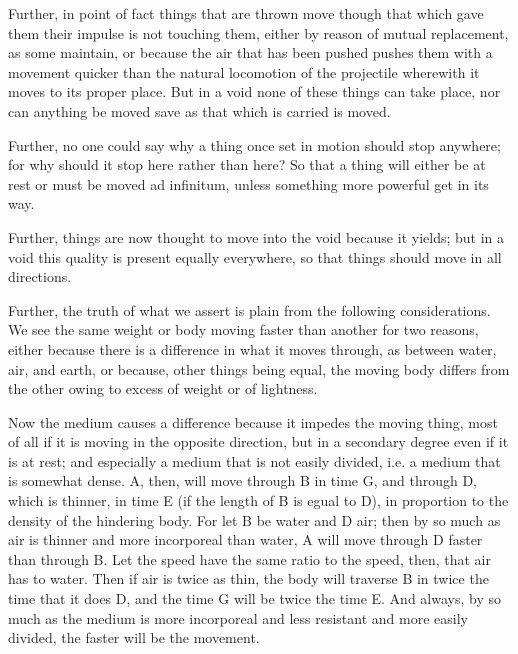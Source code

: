Further, in point of fact things that are thrown move though that
which gave them their impulse is not touching them, either by reason
of mutual replacement, as some maintain, or because the air that has
been pushed pushes them with a movement quicker than the natural locomotion
of the projectile wherewith it moves to its proper place. But in a
void none of these things can take place, nor can anything be moved
save as that which is carried is moved. 

Further, no one could say why a thing once set in motion should stop
anywhere; for why should it stop here rather than here? So that a
thing will either be at rest or must be moved ad infinitum, unless
something more powerful get in its way. 

Further, things are now thought to move into the void because it yields;
but in a void this quality is present equally everywhere, so that
things should move in all directions. 

Further, the truth of what we assert is plain from the following considerations.
We see the same weight or body moving faster than another for two
reasons, either because there is a difference in what it moves through,
as between water, air, and earth, or because, other things being equal,
the moving body differs from the other owing to excess of weight or
of lightness. 

Now the medium causes a difference because it impedes the moving thing,
most of all if it is moving in the opposite direction, but in a secondary
degree even if it is at rest; and especially a medium that is not
easily divided, i.e. a medium that is somewhat dense. A, then, will
move through B in time G, and through D, which is thinner, in time
E (if the length of B is egual to D), in proportion to the density
of the hindering body. For let B be water and D air; then by so much
as air is thinner and more incorporeal than water, A will move through
D faster than through B. Let the speed have the same ratio to the
speed, then, that air has to water. Then if air is twice as thin,
the body will traverse B in twice the time that it does D, and the
time G will be twice the time E. And always, by so much as the medium
is more incorporeal and less resistant and more easily divided, the
faster will be the movement. 

